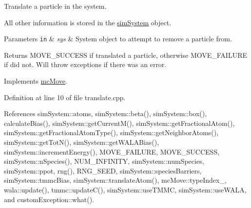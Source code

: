 Translate a particle in the system. 

All other information is stored in the \hyperlink{classsim_system}{sim\-System} object.


\begin{DoxyParams}[1]{Parameters}
\mbox{\tt in}  & {\em sys} & System object to attempt to remove a particle from.\\
\hline
\end{DoxyParams}
\begin{DoxyReturn}{Returns}
M\-O\-V\-E\-\_\-\-S\-U\-C\-C\-E\-S\-S if translated a particle, otherwise M\-O\-V\-E\-\_\-\-F\-A\-I\-L\-U\-R\-E if did not. Will throw exceptions if there was an error. 
\end{DoxyReturn}


Implements \hyperlink{classmc_move_a2e377a628f9ecee5422fc8967d4924eb}{mc\-Move}.



Definition at line 10 of file translate.\-cpp.



References sim\-System\-::atoms, sim\-System\-::beta(), sim\-System\-::box(), calculate\-Bias(), sim\-System\-::get\-Current\-M(), sim\-System\-::get\-Fractional\-Atom(), sim\-System\-::get\-Fractional\-Atom\-Type(), sim\-System\-::get\-Neighbor\-Atoms(), sim\-System\-::get\-Tot\-N(), sim\-System\-::get\-W\-A\-L\-A\-Bias(), sim\-System\-::increment\-Energy(), M\-O\-V\-E\-\_\-\-F\-A\-I\-L\-U\-R\-E, M\-O\-V\-E\-\_\-\-S\-U\-C\-C\-E\-S\-S, sim\-System\-::n\-Species(), N\-U\-M\-\_\-\-I\-N\-F\-I\-N\-I\-T\-Y, sim\-System\-::num\-Species, sim\-System\-::ppot, rng(), R\-N\-G\-\_\-\-S\-E\-E\-D, sim\-System\-::species\-Barriers, sim\-System\-::tmmc\-Bias, sim\-System\-::translate\-Atom(), mc\-Move\-::type\-Index\-\_\-, wala\-::update(), tmmc\-::update\-C(), sim\-System\-::use\-T\-M\-M\-C, sim\-System\-::use\-W\-A\-L\-A, and custom\-Exception\-::what().


